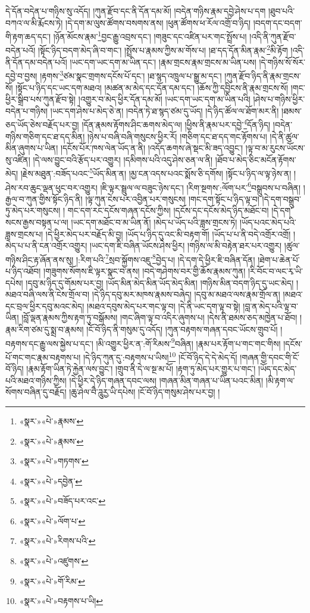 དེ་དོན་བདེན་པ་གཉིས་སུ་འདོད། །ཀུན་རྫོབ་དང་ནི་དོན་དམ་མོ། །བདེན་གཉིས་རྣམ་དབྱེ་ཤེས་པ་དག །ཐུབ་པའི་བཀའ་ལ་མི་རྨོངས་ཏེ། །དེ་དག་མ་ལུས་ཚོགས་བསགས་ནས། །ཕུན་ཚོགས་ཕ་རོལ་འགྲོ་བ་ཉིད། །བདག་དང་བདག་གི་རྟག་ཆད་དང་། །ཉོན་མོངས་རྣམ་\footnote{«སྣར་»«པེ་»རྣམས་}བྱང་རྒྱུ་འབྲས་དང་། །གཟུང་དང་འཛིན་པར་གང་སྤྲོས་པ། །འདི་ནི་ཀུན་རྫོབ་བདེན་པའོ། །སྟོང་ཉིད་བདག་མེད་ཞི་བ་གང་། །སྤྲོས་པ་རྣམས་ཀྱིས་མ་གོས་པ། །ཐ་དད་དོན་མིན་རྣམ་\footnote{«སྣར་»«པེ་»རྣམས་}མི་རྟོག །འདི་ནི་དོན་དམ་བདེན་པའོ། །ཡང་དག་ཡང་དག་མ་ཡིན་དང་། །རྣམ་གྲངས་རྣམ་གྲངས་མ་ཡིན་པས། །དེ་གཉིས་སོ་སོར་དབྱེ་བ་བྱས། །རྟགས་\footnote{«སྣར་»«པེ་»གཏགས་}ཙམ་སྣང་གྲགས་དངོས་པོ་དང་། །ཐ་སྙད་འཁྲུལ་པ་སྒྱུ་མ་དང་། །ཀུན་རྫོབ་ཉིད་ནི་རྣམ་གྲངས་སོ། །སྟོང་པ་ཉིད་དང་ཡང་དག་མཐའ། །མཚན་མ་མེད་དང་དོན་དམ་དང་། །ཆོས་ཀྱི་དབྱིངས་ནི་རྣམ་གྲངས་སོ། །གང་ཕྱིར་སྒྲིབ་པས་ཀུན་རྫོབ་སྟེ། །འགྱུར་བ་མེད་ཕྱིར་དོན་དམ་མོ། །ཡང་དག་ཡང་དག་མ་ཡིན་པའི། །ཤེས་པ་གཉིས་ཕྱིར་བདེན་པ་གཉིས། །ཡང་དག་ཤེས་པ་མེད་ཅེ་ན། །བདེན་ཏེ་ཐ་སྙད་ཙམ་དུ་ཡོད། །དེ་ཉིད་ཚོལ་ལ་ཐོག་མར་ནི། །ཐམས་ཅད་ཡོད་ཅེས་བརྗོད་པར་བྱ། །དོན་རྣམས་རྟོགས་ཤིང་ཆགས་མེད་ལ། །ཕྱིས་ནི་རྣམ་པར་དབྱེ་\footnote{«སྣར་»«པེ་»དབྱེན་}དོན་ཉིད། །བདེན་གཉིས་གཅིག་དང་ཐ་དད་མིན། །ཉེས་པ་བཞི་བཞི་གསུངས་ཕྱིར་རོ། །གཅིག་དང་ཐ་དད་གང་རྟོགས་པ། །དེ་ནི་ཚུལ་མིན་ཞུགས་པ་ཡིན། །དངོས་པོར་ཁས་ལེན་ཡོད་ན་ནི། །འདོད་ཆགས་ཞེ་སྡང་མི་ཟད་འབྱུང་། །ལྟ་བ་མ་རུངས་ཡོངས་སུ་འཛིན། །དེ་ལས་བྱུང་བའི་རྩོད་པར་འགྱུར། །དམིགས་པའི་འདུ་ཤེས་ཅན་ལ་ནི། །ཐོབ་པ་མེད་ཅིང་མངོན་རྟོགས་མེད། །རྗེས་མཐུན་:བཟོད་པའང་\footnote{«སྣར་»«པེ་»བཟོད་པར་འང་}ཡོད་མིན་ན། །མྱ་ངན་འདས་པའང་སྨོས་ཅི་དགོས། །སྟོང་པ་ཉིད་ལ་ལྟ་ཉེས་ན། །ཤེས་རབ་ཆུང་ལྡན་ཕུང་བར་འགྱུར། །ཇི་ལྟར་སྦྲུལ་ལ་བཟུང་ཉེས་དང་། །རིག་སྔགས་:ལོག་པར་\footnote{«སྣར་»«པེ་»ལོག་པ་}བསྒྲུབས་པ་བཞིན། །རྒྱལ་བ་ཀུན་གྱིས་སྟོང་ཉིད་ནི། །ལྟ་ཀུན་ངེས་པར་འབྱིན་པར་གསུངས། །གང་དག་སྟོང་པ་ཉིད་ལྟ་བ། །དེ་དག་བསྒྲུབ་ཏུ་མེད་པར་གསུངས། །
གང་དག་རང་དངོས་གཞན་དངོས་ཀྱིས། །དངོས་དང་དངོས་མེད་ཉིད་མཐོང་བ། །དེ་དག་སངས་རྒྱས་བསྟན་པ་ལ། །ཡང་དག་མཐོང་བ་མ་ཡིན་ནོ། །མེད་པ་ཡོད་པའི་ཟླས་གྲངས་ཏེ། །ཡོད་པའང་མེད་པའི་ཟླས་གྲངས་པ། །དེ་ཕྱིར་མེད་པར་བརྗོད་མི་བྱ། །ཡོད་པ་ཉིད་དུ་འང་མི་བརྟག་གོ། །ཡོད་པ་པ་ནི་བདེ་འགྲོར་འགྲོ། །མེད་པ་པ་ནི་ངན་འགྲོར་འགྱུར། །ཡང་དག་ཇི་བཞིན་ཡོངས་ཤེས་ཕྱིར། །གཉིས་ལ་མི་བརྟེན་ཐར་པར་འགྱུར། །ཚུལ་གཉིས་ཤིང་རྟ་ཞོན་ནས་སུ། །:རིག་པའི་\footnote{«སྣར་»«པེ་»རིགས་པའི་}སྲབ་སྐྱོགས་འཇུ་\footnote{«སྣར་»«པེ་»འཛུགས་}བྱེད་པ། །དེ་དག་དེ་ཕྱིར་ཇི་བཞིན་དོན། །ཐེག་པ་ཆེན་པོ་པ་ཉིད་འཐོབ། །གཟུགས་སོགས་ཇི་ལྟར་སྣང་བ་ནས། །བདེ་གཤེགས་བར་གྱི་ཆོས་རྣམས་ཀུན། །རི་བོང་བ་ལང་རྭ་ཡི་དཔེས། །དབུ་མ་ཉིད་དུ་གོམས་པར་བྱ། །ཡོད་མིན་མེད་མིན་ཡོད་མེད་མིན། །གཉིས་མིན་བདག་ཉིད་དུ་ཡང་མེད། །མཐའ་བཞི་ལས་ནི་ངེས་གྲོལ་བ། །དེ་ཉིད་དབུ་མར་མཁས་རྣམས་བཞེད། །དབུ་མ་མཐའ་ལས་རྣམ་གྲོལ་ན། །མཐའ་དང་བྲལ་ཕྱིར་དབུ་མའང་མེད། །མཐའ་དབུས་མེད་པར་གང་ལྟ་བ། །དེ་ནི་ཡང་དག་ལྟ་བ་སྟེ། །བླ་ན་མེད་པའི་ལྟ་བ་ཡིན། །བློ་ལྡན་རྣམས་ཀྱིས་རྟག་ཏུ་བསྒོམས། །གང་ཞིག་ལྟ་བ་འདིར་ཞུགས་པ། །དེས་ནི་ཐམས་ཅད་མཁྱེན་པ་ཐོབ། །རྣམ་རིག་ཙམ་དུ་སྨྲ་བ་རྣམས། །ངོ་བོ་ཉིད་ནི་གསུམ་དུ་འདོད། །ཀུན་བརྟགས་གཞན་དབང་ཡོངས་གྲུབ་པོ། །བརྟགས་དང་རྒྱུ་ལས་སྐྱེས་པ་དང་། །མི་འགྱུར་ཕྱིར་ན་:གོ་རིམས་\footnote{«སྣར་»«པེ་»གོ་རིམ་}བཞིན། །རྣམ་པར་རྟོག་པ་གང་གང་གིས། །དངོས་པོ་གང་གང་རྣམ་བརྟགས་པ། །དེ་ཉིད་ཀུན་དུ་:བརྟགས་པ་ཡིས།\footnote{«སྣར་»«པེ་»བརྟགས་པ་ཡི།} །ངོ་བོ་ཉིད་དེ་དེ་མེད་དོ། །གཞན་གྱི་དབང་གི་ངོ་བོ་ཉིད། །རྣམ་རྟོག་ཡིན་ཏེ་རྐྱེན་ལས་བྱུང་། །གྲུབ་ནི་དེ་ལ་སྔ་མ་པོ། །རྟག་ཏུ་མེད་པར་གྱུར་པ་གང་། །ཡོད་དང་མེད་པའི་མཐའ་གཉིས་ཀྱིས། །དེ་ཕྱིར་དེ་ཉིད་གཞན་དབང་ལས། །གཞན་མིན་གཞན་པ་ཡིན་པའང་མིན། །མི་རྟག་ལ་སོགས་བཞིན་དུ་བརྗོད། །ཆུ་ཤེལ་བཻ་ཌཱུརྱ་ཡི་དཔེས། །ངོ་བོ་ཉིད་གསུམ་ཤེས་པར་བྱ། །
